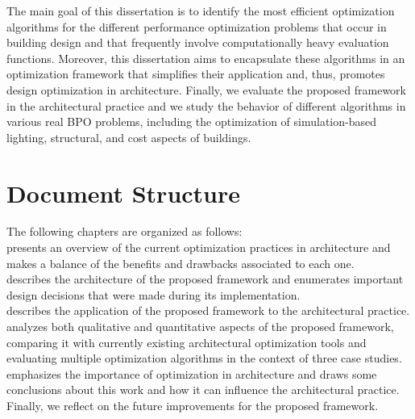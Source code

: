The main goal of this dissertation is to identify the most efficient optimization algorithms for the different performance optimization problems that occur in building design and that frequently involve computationally heavy evaluation functions. Moreover, this dissertation aims to encapsulate these algorithms in an optimization framework that simplifies their application and, thus, promotes design optimization in architecture. Finally, we evaluate the proposed framework in the architectural practice and we study the behavior of different algorithms in various real \ac{BPO} problems, including the optimization of simulation-based lighting, structural, and cost aspects of buildings. 

\section{Document Structure}
The following chapters are organized as follows: \\ 
\textbf{} presents an overview of the current optimization practices in architecture and makes a balance of the benefits and drawbacks associated to each one.  \\
\textbf{} describes the architecture of the proposed framework and enumerates important design decisions that were made during its implementation. \\
\textbf{} describes the application of the proposed framework to the architectural practice. \\
\textbf{} analyzes both qualitative and quantitative aspects of the proposed framework, comparing it with currently existing architectural optimization tools and evaluating multiple optimization algorithms in the context of three case studies. \\
\textbf{} emphasizes the importance of optimization in architecture and draws some conclusions about this work and how it can influence the architectural practice. Finally, we reflect on the future improvements for the proposed framework.



